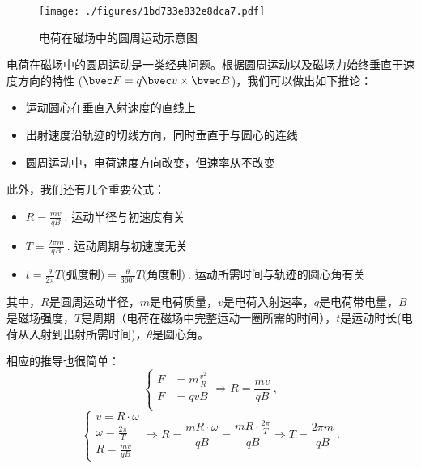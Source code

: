 

\begin{figure}[ht]
\centering
\texttt{[image: ./figures/1bd733e832e8dca7.pdf]}
\caption{电荷在磁场中的圆周运动示意图} \label{fig_CBM_1}
\end{figure}

电荷在磁场中的圆周运动是一类经典问题。根据圆周运动以及磁场力始终垂直于速度方向的特性 ($\bvec F = q\bvec v \times \bvec B$)，我们可以做出如下推论：
\begin{itemize}
\item 运动圆心在垂直入射速度的直线上
\item 出射速度沿轨迹的切线方向，同时垂直于与圆心的连线
\item 圆周运动中，电荷速度方向改变，但速率从不改变
\end{itemize}

此外，我们还有几个重要公式：
\begin{itemize}
\item $R=\frac{mv}{qB}~.$ 运动半径与初速度有关
\item $T=\frac{2\pi m}{qB}~.$ 运动周期与初速度无关
\item $t = \frac{\theta}{2\pi} T\text{(弧度制)}= \frac{\theta}{360^\circ } T\text{(角度制)}~.$ 运动所需时间与轨迹的圆心角有关
\end{itemize}
其中，$R$是圆周运动半径，$m$是电荷质量，$v$是电荷入射速率，$q$是电荷带电量，$B$是磁场强度，$T$是周期（电荷在磁场中完整运动一圈所需的时间），$t$是运动时长(电荷从入射到出射所需时间)，$\theta$是圆心角。

相应的推导也很简单：
$$
\left \{
\begin{aligned}
F&=m\frac{v^2}{R}\\
F&=qvB\\
\end{aligned}
\Rightarrow
R=\frac{mv}{qB}
\right.
~,
$$
$$
\left \{
\begin{aligned}
v=R\cdot\omega\\
\omega = \frac{2\pi}{T}\\
R=\frac{mv}{qB}
\end{aligned}
\Rightarrow
R=\frac{mR\cdot\omega}{qB}=\frac{mR\cdot\frac{2\pi}{T}}{qB}
\Rightarrow
T=\frac{2\pi m}{qB}
\right.
~.
$$
